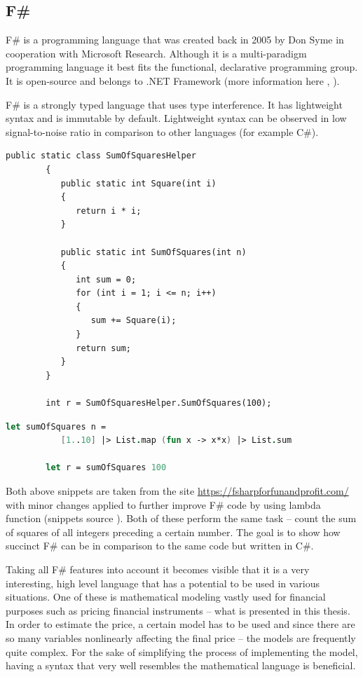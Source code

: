 \subsection{F\#}
    F\# is a programming language that was created back in 2005 by Don Syme in cooperation with Microsoft Research. Although it is a multi-paradigm programming language it best fits the functional, declarative programming group. It is open-source and belongs to .NET Framework (more information here \cite{WhatIsFSharp},  \cite{FSharpWiki}).
    
    F\# is a strongly typed language that uses type interference. It has lightweight syntax and is immutable by default. Lightweight syntax can be observed in low signal-to-noise ratio in comparison to other languages (for example C\#).
    
    \begin{lstlisting}[caption=C\# code example]
        public static class SumOfSquaresHelper
        {
           public static int Square(int i)
           {
              return i * i;
           }
    
           public static int SumOfSquares(int n)
           {
              int sum = 0;
              for (int i = 1; i <= n; i++)
              {
                 sum += Square(i);
              }
              return sum;
           }
        }
        
        int r = SumOfSquaresHelper.SumOfSquares(100);
    \end{lstlisting}
    
    \begin{lstlisting}[language=FSharp, caption=F\# code example]
        let sumOfSquares n = 
           [1..10] |> List.map (fun x -> x*x) |> List.sum
        
        let r = sumOfSquares 100
    \end{lstlisting}
    
    Both above snippets are taken from the site \url{https://fsharpforfunandprofit.com/} with minor changes applied to further improve F\# code by using lambda function (snippets source \cite{compareCandF}). Both of these perform the same task -- count the sum of squares of all integers preceding a certain number. The goal is to show how succinct F\# can be in comparison to the same code but written in C\#.
    
    Taking all F\# features into account it becomes visible that it is a very interesting, high level language that has a potential to be used in various situations. One of these is mathematical modeling vastly used for financial purposes such as pricing financial instruments -- what is presented in this thesis. In order to estimate the price, a certain model has to be used and since there are so many variables nonlinearly affecting the final price -- the models are frequently quite complex. For the sake of simplifying the process of implementing the model, having a syntax that very well resembles the mathematical language is beneficial.
    
